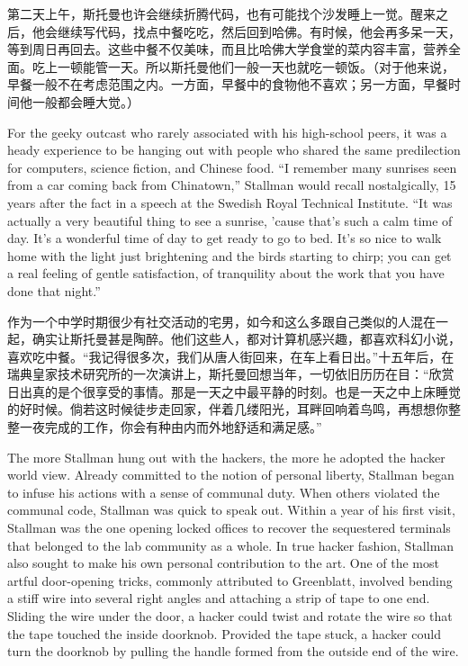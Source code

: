 \ifdefined\chs
第二天上午，斯托曼也许会继续折腾代码，也有可能找个沙发睡上一觉。醒来之后，他会继续写代码，找点中餐吃吃，然后回到哈佛。有时候，他会再多呆一天，等到周日再回去。这些中餐不仅美味，而且比哈佛大学食堂的菜内容丰富，营养全面。吃上一顿能管一天。所以斯托曼他们一般一天也就吃一顿饭。（对于他来说，早餐一般不在考虑范围之内。一方面，早餐中的食物他不喜欢；另一方面，早餐时间他一般都会睡大觉。）
\fi

\ifdefined\eng
For the geeky outcast who rarely associated with his high-school peers, it was a heady experience to be hanging out with people who shared the same predilection for computers, science fiction, and Chinese food. ``I remember many sunrises seen from a car coming back from Chinatown,'' Stallman would recall nostalgically, 15 years after the fact in a speech at the Swedish Royal Technical Institute. ``It was actually a very beautiful thing to see a sunrise, 'cause that's such a calm time of day. It's a wonderful time of day to get ready to go to bed. It's so nice to walk home with the light just brightening and the birds starting to chirp; you can get a real feeling of gentle satisfaction, of tranquility about the work that you have done that night.''
\fi

\ifdefined\chs
作为一个中学时期很少有社交活动的宅男，如今和这么多跟自己类似的人混在一起，确实让斯托曼甚是陶醉。他们这些人，都对计算机感兴趣，都喜欢科幻小说，喜欢吃中餐。``我记得很多次，我们从唐人街回来，在车上看日出。''十五年后，在瑞典皇家技术研究所的一次演讲上，斯托曼回想当年，一切依旧历历在目：``欣赏日出真的是个很享受的事情。那是一天之中最平静的时刻。也是一天之中上床睡觉的好时候。倘若这时候徒步走回家，伴着几缕阳光，耳畔回响着鸟鸣，再想想你整整一夜完成的工作，你会有种由内而外地舒适和满足感。''
\fi

\ifdefined\eng
The more Stallman hung out with the hackers, the more he adopted the hacker world view. Already committed to the notion of personal liberty, Stallman began to infuse his actions with a sense of communal duty. When others violated the communal code, Stallman was quick to speak out. Within a year of his first visit, Stallman was the one opening locked offices to recover the sequestered terminals that belonged to the lab community as a whole. In true hacker fashion, Stallman also sought to make his own personal contribution to the art. One of the most artful door-opening tricks, commonly attributed to Greenblatt, involved bending a stiff wire into several right angles and attaching a strip of tape to one end. Sliding the wire under the door, a hacker could twist and rotate the wire so that the tape touched the inside doorknob. Provided the tape stuck, a hacker could turn the doorknob by pulling the handle formed from the outside end of the wire.
\fi

